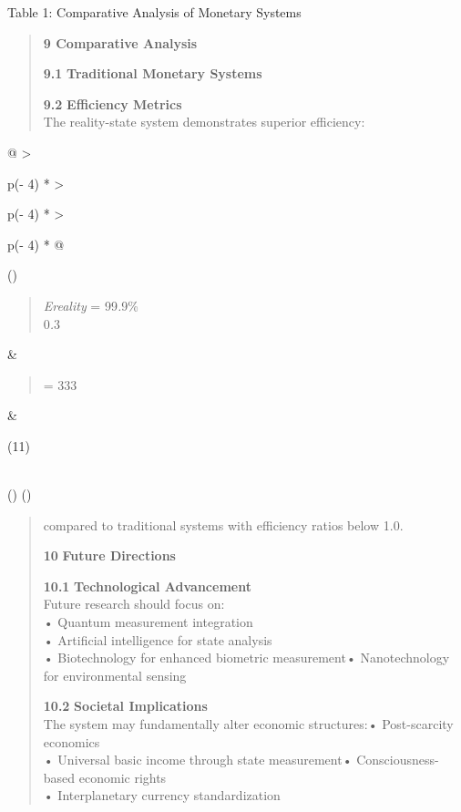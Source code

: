 \documentclass[
]{article}
\begin{document}
Table 1: Comparative Analysis of Monetary Systems

\begin{quote}
\textbf{9 Comparative Analysis}

\textbf{9.1} \textbf{Traditional Monetary Systems}

\textbf{9.2} \textbf{Efficiency Metrics}\\
The reality-state system demonstrates superior efficiency:
\end{quote}

\begin{longtable}[]{@{}
  >{\raggedright\arraybackslash}p{(\columnwidth - 4\tabcolsep) * }
  >{\raggedright\arraybackslash}p{(\columnwidth - 4\tabcolsep) * }
  >{\raggedright\arraybackslash}p{(\columnwidth - 4\tabcolsep) * }@{}}
\toprule()
\begin{minipage}[b]{\linewidth}\raggedright
\begin{quote}
\emph{Ereality} = 99\emph{.}9\%\\
0\emph{.}3
\end{quote}\strut
\end{minipage} & \begin{minipage}[b]{\linewidth}\raggedright
\begin{quote}
= 333
\end{quote}
\end{minipage} & \begin{minipage}[b]{\linewidth}\raggedright
(11)
\end{minipage} \\
\midrule()
\endhead
\bottomrule()
\end{longtable}

\begin{quote}
compared to traditional systems with efficiency ratios below 1.0.

\textbf{10} \textbf{Future Directions}

\textbf{10.1} \textbf{Technological Advancement}\\
Future research should focus on:\\
• Quantum measurement integration\\
• Artificial intelligence for state analysis\\
• Biotechnology for enhanced biometric measurement• Nanotechnology for
environmental sensing

\textbf{10.2} \textbf{Societal Implications}\\
The system may fundamentally alter economic structures:• Post-scarcity
economics\\
• Universal basic income through state measurement• Consciousness-based
economic rights\\
• Interplanetary currency standardization
\end{quote}
\end{document}

